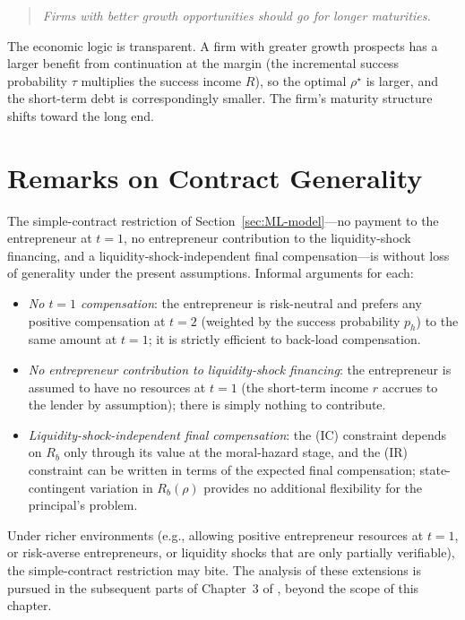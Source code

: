 \documentclass[11pt,a4paper,oneside]{book}
\theoremstyle{plain}
\theoremstyle{definition}
\theoremstyle{remark}
\numberwithin{equation}{chapter}
\begin{document}
\begin{quote}
\emph{Firms with better growth opportunities should go for longer maturities.}
\end{quote}

The economic logic is transparent.
A firm with greater growth prospects has a larger benefit from continuation at the margin (the incremental success probability $\tau$ multiplies the success income $R$), so the optimal $\rho^\star$ is larger, and the short-term debt is correspondingly smaller.
The firm's maturity structure shifts toward the long end.

\section{Remarks on Contract Generality}
\label{sec:ML-remarks}

The simple-contract restriction of Section~\ref{sec:ML-model}---no payment to the entrepreneur at $t=1$, no entrepreneur contribution to the liquidity-shock financing, and a liquidity-shock-independent final compensation---is without loss of generality under the present assumptions.
Informal arguments for each:

\begin{itemize}
  \item \emph{No $t=1$ compensation}: the entrepreneur is risk-neutral and prefers any positive compensation at $t=2$ (weighted by the success probability $p_h$) to the same amount at $t=1$; it is strictly efficient to back-load compensation.
  \item \emph{No entrepreneur contribution to liquidity-shock financing}: the entrepreneur is assumed to have no resources at $t=1$ (the short-term income $r$ accrues to the lender by assumption); there is simply nothing to contribute.
  \item \emph{Liquidity-shock-independent final compensation}: the (IC) constraint depends on $R_b$ only through its value at the moral-hazard stage, and the (IR) constraint can be written in terms of the expected final compensation; state-contingent variation in $R_b(\rho)$ provides no additional flexibility for the principal's problem.
\end{itemize}

Under richer environments (e.g., allowing positive entrepreneur resources at $t=1$, or risk-averse entrepreneurs, or liquidity shocks that are only partially verifiable), the simple-contract restriction may bite.
The analysis of these extensions is pursued in the subsequent parts of Chapter~3 of \citet{Tirole2006}, beyond the scope of this chapter.
\end{document}
